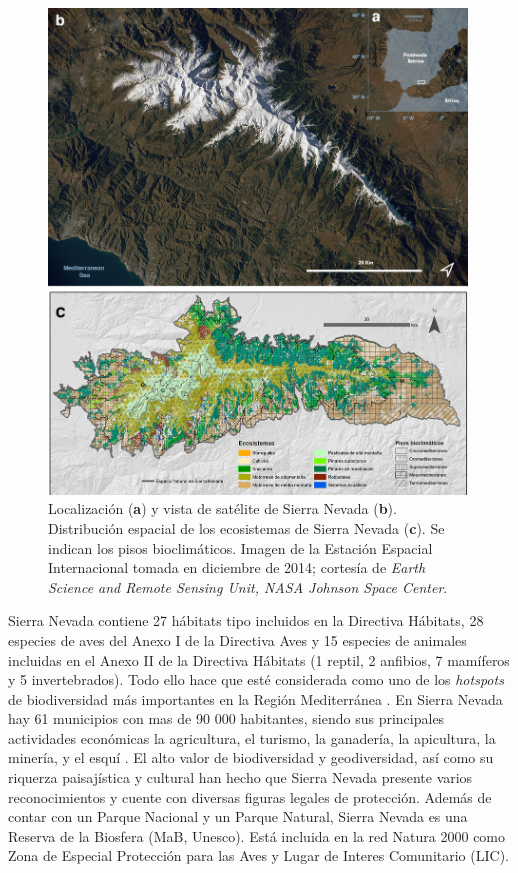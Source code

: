 \begin{figure}
	\centering
	\includegraphics[width=0.99\textwidth]{img/metodologia/metodologia-mapasn.jpg}
	\caption{Localización (\textbf{a}) y vista de satélite de Sierra Nevada (\textbf{b}). Distribución espacial de los ecosistemas de Sierra Nevada  (\textbf{c}). Se indican los pisos bioclimáticos. Imagen de la Estación Espacial Internacional tomada en diciembre de 2014; cortesía de \emph{Earth Science and Remote Sensing Unit, NASA Johnson Space Center}.}\label{fig:metodologia:mapa-sn}
\end{figure}


Sierra Nevada contiene 27 hábitats tipo incluidos en la Directiva Hábitats, 28 especies de aves del Anexo I de la Directiva Aves y 15 especies de animales incluidas en el Anexo II de la Directiva Hábitats (1 reptil, 2 anfibios, 7 mamíferos y 5 invertebrados). Todo ello hace que esté considerada como uno de los \emph{hotspots} de biodiversidad más importantes en la Región Mediterránea \autocites{Blanca1996ProteccionFlora,Blancaetal1998ThreatenedVascular,MedailQuezel1999BiodiversityHotspots,Canadasetal2014HotspotsHotspots}. En Sierra Nevada hay 61 municipios con mas de 90 000 habitantes, siendo sus principales actividades económicas la agricultura, el turismo, la ganadería, la apicultura, la minería, y el esquí \autocite{FernandezMarquezSalinas2009ImpactoSocioeconomico}. El alto valor de biodiversidad y geodiversidad, así como su riquerza paisajística y cultural han hecho que Sierra Nevada presente varios reconocimientos y cuente con diversas figuras legales de protección. Además de contar con un Parque Nacional y un Parque Natural, Sierra Nevada es una Reserva de la Biosfera (MaB, Unesco). Está incluida en la red Natura 2000 como Zona de Especial Protección para las Aves y Lugar de Interes Comunitario (LIC). 


